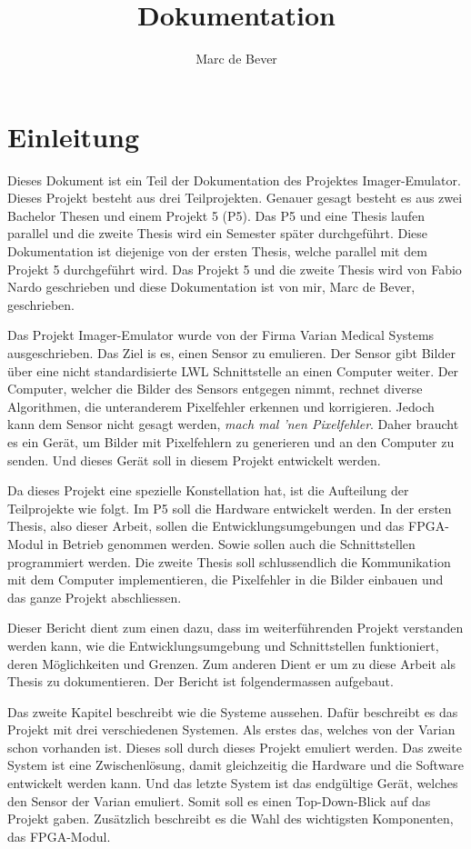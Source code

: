 \documentclass{article}
\title{Dokumentation}
\author{Marc de Bever}
\begin{document}
\maketitle
\tableofcontents

\section{Einleitung}
Dieses Dokument ist ein Teil der Dokumentation des Projektes Imager-Emu\-lator. Dieses Projekt besteht aus drei Teilprojekten. 
Genauer gesagt besteht es aus zwei Bachelor Thesen und einem Projekt 5 (P5). 
Das P5 und eine Thesis laufen parallel und die zweite Thesis wird ein Semester später durchgeführt. Diese Dokumentation ist diejenige von der ersten Thesis, welche parallel mit dem Projekt 5 durchgeführt wird. Das Projekt 5 und die zweite Thesis wird von Fabio Nardo geschrieben und diese Dokumentation ist von mir, Marc de Bever, geschrieben. 

Das Projekt Imager-Emulator wurde von der Firma Varian Medical Systems ausgeschrieben. Das Ziel is es, einen Sensor zu emulieren. Der Sensor gibt Bilder über eine nicht standardisierte LWL Schnittstelle an einen Computer weiter. Der Computer, welcher die Bilder des Sensors entgegen nimmt, rechnet diverse Algorithmen, die unteranderem Pixelfehler erkennen und korrigieren. Jedoch kann dem Sensor nicht gesagt werden, \textit{mach mal 'nen Pixelfehler}. Daher braucht es ein Gerät, um Bilder mit Pixelfehlern zu generieren und an den Computer zu senden. Und dieses Gerät soll in diesem Projekt entwickelt werden.

Da dieses Projekt eine spezielle Konstellation hat, ist die Aufteilung der Teilprojekte wie folgt. Im P5 soll die Hardware entwickelt werden. In der ersten Thesis, also dieser Arbeit, sollen die Entwicklungsumgebungen und das FPGA-Modul in Betrieb genommen werden. Sowie sollen auch die Schnittstellen programmiert werden. Die zweite Thesis soll schlussendlich die Kommunikation mit dem Computer implementieren, die Pixelfehler in die Bilder einbauen und das ganze Projekt abschliessen.

Dieser Bericht dient zum einen dazu, dass im weiterführenden Projekt verstanden werden kann, wie die Entwicklungsumgebung und Schnittstellen funktioniert, deren Möglichkeiten und Grenzen. Zum anderen Dient er um zu diese Arbeit als Thesis zu dokumentieren. Der Bericht ist folgendermassen aufgebaut.

Das zweite Kapitel beschreibt wie die Systeme aussehen. Dafür beschreibt es das Projekt mit drei verschiedenen Systemen. Als erstes das, welches von der Varian schon vorhanden ist. Dieses soll durch dieses Projekt emuliert werden. Das zweite System ist eine Zwischenlösung, damit gleichzeitig die Hardware und die Software entwickelt werden kann. Und das letzte System ist das endgültige Gerät, welches den Sensor der Varian emuliert. Somit soll es einen Top-Down-Blick auf das Projekt gaben. Zusätzlich beschreibt es die Wahl des wichtigsten Komponenten, das FPGA-Modul.
\end{document}

